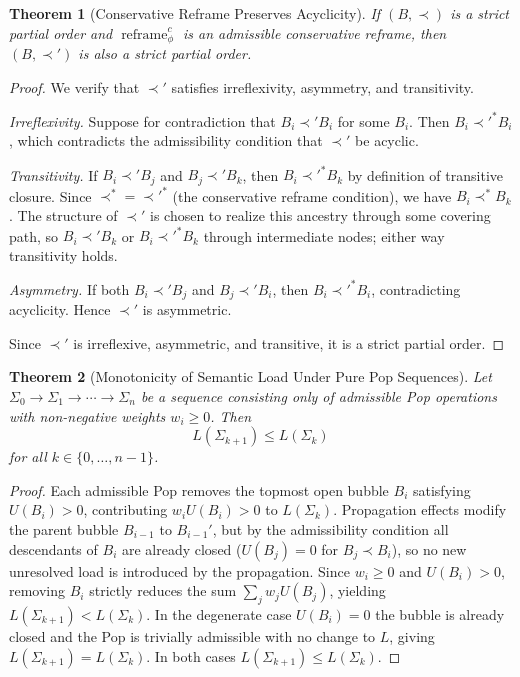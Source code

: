 \documentclass[12pt, a4paper]{article}
\theoremstyle{plain}
\newtheorem{theorem}{Theorem}[section]
\theoremstyle{definition}
\theoremstyle{remark}
\DeclareMathOperator{\Reframe}{reframe}
\begin{document}
\begin{theorem}[Conservative Reframe Preserves Acyclicity]
If $(B, \prec)$ is a strict partial order and $\Reframe^c_\phi$ is an admissible
conservative reframe, then $(B, \prec')$ is also a strict partial order.
\end{theorem}

\begin{proof}
We verify that $\prec'$ satisfies irreflexivity, asymmetry, and transitivity.

\emph{Irreflexivity.} Suppose for contradiction that $B_i \prec' B_i$ for
some $B_i$. Then $B_i \prec'^* B_i$, which contradicts the admissibility
condition that $\prec'$ be acyclic.

\emph{Transitivity.} If $B_i \prec' B_j$ and $B_j \prec' B_k$, then
$B_i \prec'^* B_k$ by definition of transitive closure. Since $\prec^* =
\prec'^*$ (the conservative reframe condition), we have $B_i \prec^* B_k$.
The structure of $\prec'$ is chosen to realize this ancestry through some
covering path, so $B_i \prec' B_k$ or $B_i \prec'^* B_k$ through
intermediate nodes; either way transitivity holds.

\emph{Asymmetry.} If both $B_i \prec' B_j$ and $B_j \prec' B_i$, then
$B_i \prec'^* B_i$, contradicting acyclicity. Hence $\prec'$ is asymmetric.

Since $\prec'$ is irreflexive, asymmetric, and transitive, it is a strict
partial order.
\end{proof}

\begin{theorem}[Monotonicity of Semantic Load Under Pure Pop Sequences]
Let $\Sigma_0 \to \Sigma_1 \to \cdots \to \Sigma_n$ be a sequence consisting
only of admissible Pop operations with non-negative weights $w_i \geq 0$.
Then
\[
  L(\Sigma_{k+1}) \leq L(\Sigma_k)
\]
for all $k \in \{0, \ldots, n-1\}$.
\end{theorem}

\begin{proof}
Each admissible Pop removes the topmost open bubble $B_i$ satisfying
$U(B_i) > 0$, contributing $w_i U(B_i) > 0$ to $L(\Sigma_k)$. Propagation
effects modify the parent bubble $B_{i-1}$ to $B_{i-1}'$, but by the
admissibility condition all descendants of $B_i$ are already closed
($U(B_j) = 0$ for $B_j \prec B_i$), so no new unresolved load is introduced
by the propagation. Since $w_i \geq 0$ and $U(B_i) > 0$, removing $B_i$
strictly reduces the sum $\sum_j w_j U(B_j)$, yielding $L(\Sigma_{k+1}) <
L(\Sigma_k)$. In the degenerate case $U(B_i) = 0$ the bubble is already
closed and the Pop is trivially admissible with no change to $L$, giving
$L(\Sigma_{k+1}) = L(\Sigma_k)$. In both cases $L(\Sigma_{k+1}) \leq
L(\Sigma_k)$.
\end{proof}
\end{document}
